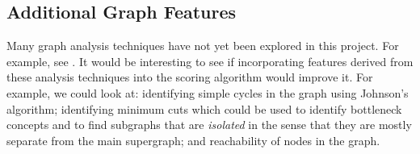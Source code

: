 \documentclass[12pt]{article}
\theoremstyle{grammarstyle}
\begin{document}

\subsection{Additional Graph Features}
Many graph analysis techniques have not yet been explored in this project. For example, see \citep{algorithms_documentation}. It would be interesting to see if incorporating features derived from these analysis techniques into the scoring algorithm would improve it. For example, we could look at: identifying simple cycles in the graph using Johnson's algorithm; identifying minimum cuts which could be used to identify bottleneck concepts and to find subgraphs that are \textit{isolated} in the sense that they are mostly separate from the main supergraph; and reachability of nodes in the graph.
\end{document}
